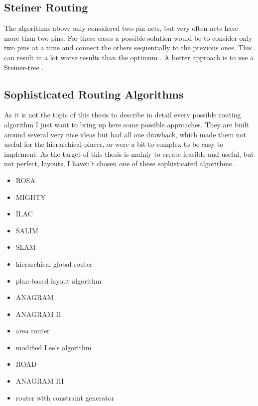 \subsection{Steiner Routing}
The algorithms above only considered two-pin nets, but very often nets have more than two pins. For these cases a possible solution would be to consider only two pins at a time and connect the others sequentially to the previous ones. This can result in a lot worse results than the optimum \cite[p. 701]{kaufmann:electronic_design_automation}. A better approach is to use a Steiner-tree \cite[page 153]{springer:eda_analog_routing}.

\subsection{Sophisticated Routing Algorithms}
As it is not the topic of this thesis to describe in detail every possible routing algorithm I just want to bring up here some possible approaches. They are built around several very nice ideas but had all one drawback, which made them not useful for the hierarchical placer, or were a bit to complex to be easy to implement. As the target of this thesis is mainly to create feasible and useful, but not perfect, layouts, I haven't chosen one of these sophisticated algorithms.
\begin{itemize}
\item ROSA \cite[page 165]{springer:eda_analog_routing}
\item MIGHTY \cite[page 166]{springer:eda_analog_routing}
\item ILAC \cite[page 167]{springer:eda_analog_routing}
\item SALIM \cite[page 167]{springer:eda_analog_routing}
\item SLAM \cite[page 167]{springer:eda_analog_routing}
\item hierarchical global router \cite[page 168]{springer:eda_analog_routing}
\item plan-based layout algorithm \cite[page 168]{springer:eda_analog_routing}
\item ANAGRAM \cite[page 168]{springer:eda_analog_routing}
\item ANAGRAM II \cite[page 168]{springer:eda_analog_routing}
\item area router \cite[page 168]{springer:eda_analog_routing}
\item modified Lee's algorithm \cite[page 170]{springer:eda_analog_routing}
\item ROAD \cite[page 170]{springer:eda_analog_routing}
\item ANAGRAM III \cite[page 170]{springer:eda_analog_routing}
\item router with constraint generator \cite[page 172]{springer:eda_analog_routing}
\end{itemize}

